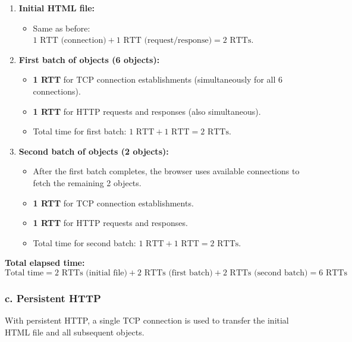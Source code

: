 \documentclass{cshwk}
\begin{document}
    \begin{enumerate}
        \item \textbf{Initial HTML file:}
        \begin{itemize}
            \item Same as before: \( 1 \text{ RTT (connection)} + 1 \text{ RTT (request/response)} = 2 \text{ RTTs} \).
        \end{itemize}
        
        \item \textbf{First batch of objects (6 objects):}
        \begin{itemize}
            \item \textbf{1 RTT} for TCP connection establishments (simultaneously for all 6 connections).
            \item \textbf{1 RTT} for HTTP requests and responses (also simultaneous).
            \item Total time for first batch: \( 1 \text{ RTT} + 1 \text{ RTT} = 2 \text{ RTTs} \).
        \end{itemize}
        
        \item \textbf{Second batch of objects (2 objects):}
        \begin{itemize}
            \item After the first batch completes, the browser uses available connections to fetch the remaining 2 objects.
            \item \textbf{1 RTT} for TCP connection establishments.
            \item \textbf{1 RTT} for HTTP requests and responses.
            \item Total time for second batch: \( 1 \text{ RTT} + 1 \text{ RTT} = 2 \text{ RTTs} \).
        \end{itemize}
    \end{enumerate}

    \noindent \textbf{Total elapsed time:}
    \[
    \text{Total time} = 2 \text{ RTTs (initial file)} + 2 \text{ RTTs (first batch)} + 2 \text{ RTTs (second batch)} = \boxed{6 \text{ RTTs}}
    \]

    \subsubsection*{c. Persistent HTTP}

    With persistent HTTP, a single TCP connection is used to transfer the initial HTML file and all subsequent objects.
\end{document}
